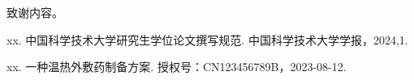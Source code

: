 \begin{acknowledgements}
  致谢内容。
\end{acknowledgements}

\begin{achievements}

\begin{theachievements}[已发表论文]
  \item xx. 中国科学技术大学研究生学位论文撰写规范. 中国科学技术大学学报，2024,1.
\end{theachievements}

\begin{theachievements}[发明专利]
  \item xx. 一种温热外敷药制备方案. 授权号：CN123456789B，2023-08-12.
\end{theachievements}

\end{achievements}
